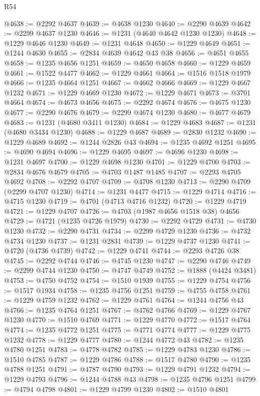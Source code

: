 \begin{lexlean}{R54}
\begin{coremodule}
@4638 := @2292 @4637
@4639 := @4638 @1230
@4640 := @2290 @4639
@4642 := @2299 @4637 @1230
@4646 := @1231 (@4640 @4642 @1230 @1230)
@4648 := @1229 @4646 @1230
@4649 := @1231 @4648
@4650 := @1229 @4649
@4651 := @1244 @4630
@4655 := @2834 @4639 @4642 @43 @38
@4656 := @4651 @4655
@4658 := @1235 @4656 @1251
@4659 := @4650 @4658
@4660 := @1229 @4659
@4661 := @1522 @4477
@4662 := @1229 @4661
@4664 := @1516 @1518 @1979
@4666 := @1235 @4664 @1251
@4667 := @4662 @4666
@4669 := @1229 @4667 @1232
@4671 := @1229 @4669 @1230
@4672 := @1229 @4671
@4673 := @3701 @4664
@4674 := @4673 @4656
@4675 := @2292 @4674
@4676 := @4675 @1230
@4677 := @2290 @4676
@4679 := @2299 @4674 @1230
@4680 := @4677 @4679
@4683 := @1231 (@4680 @3411 @1230)
@4684 := @1229 @4683
@4687 := @1231 (@4680 @3434 @1230)
@4688 := @1229 @4687
@4689 := @2830 @1232
@4690 := @1229 @4689
@4692 := @1244 @2826 @43
@4694 := @1235 @4692 @1251
@4695 := @4690 @4694
@4696 := @1229 @4695
@4697 := @4696 @1230
@4698 := @1231 @4697
@4700 := @1229 @4698 @1230
@4701 := @1229 @4700
@4703 := @2834 @4676 @4679
@4705 := @4703 @1487 @1485
@4707 := @2293 @4705 @4692
@4708 := @2292 @4707
@4709 := @4708 @1230
@4713 := @2290 @4709 (@2299 @4707 @1230)
@4714 := @1231 @4477
@4715 := @1229 @4714
@4716 := @4715 @1230
@4719 := @4701 (@4713 @4716 @1232)
@4720 := @1229 @4719
@4721 := @1229 @4707
@4726 := @4703 (@1987 @4656 @1518 @38) @4656
@4729 := @4721 (@1235 @4726 @1979)
@4730 := @2292 @4729
@4731 := @4730 @1230
@4732 := @2290 @4731
@4734 := @2299 @4729 @1230
@4736 := @4732 @4734 @1230
@4737 := @1231 @2831
@4739 := @1229 @4737 @1230
@4741 := @4720 (@4736 @4739)
@4742 := @1229 @4741
@4744 := @2293 @4726 @38
@4745 := @2292 @4744
@4746 := @4745 @1230
@4747 := @2290 @4746
@4749 := @2299 @4744 @1230
@4750 := @4747 @4749
@4752 := @1888 (@4424 @3481)
@4753 := @4750 @4752
@4754 := @1510 @1939
@4755 := @1229 @4754
@4756 := @1517 @1934
@4758 := @1235 @4756 @1251
@4759 := @4755 @4758
@4761 := @1229 @4759 @1232
@4762 := @1229 @4761
@4764 := @1244 @4756 @43
@4766 := @1235 @4764 @1251
@4767 := @4762 @4766
@4769 := @1229 @4767 @1230
@4770 := @1510 @4769
@4771 := @1229 @4770
@4772 := @1517 @4764
@4774 := @1235 @4772 @1251
@4775 := @4771 @4774
@4777 := @1229 @4775 @1232
@4778 := @1229 @4777
@4780 := @1244 @4772 @43
@4782 := @1235 @4780 @1251
@4783 := @4778 @4782
@4785 := @1229 @4783 @1230
@4786 := @1510 @4785
@4787 := @1229 @4786
@4788 := @1517 @4780
@4790 := @1235 @4788 @1251
@4791 := @4787 @4790
@4793 := @1229 @4791 @1232
@4794 := @1229 @4793
@4796 := @1244 @4788 @43
@4798 := @1235 @4796 @1251
@4799 := @4794 @4798
@4801 := @1229 @4799 @1230
@4802 := @1510 @4801

\end{coremodule}
\end{lexlean}
